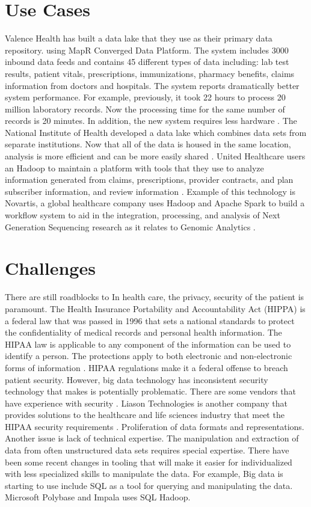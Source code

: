 \documentclass[sigconf]{acmart}
\begin{document}
 \section{Use Cases}
Valence Health has built a data lake that they use as their primary data repository. using MapR Converged Data Platform. The system includes 3000 inbound data feeds and contains 45 different types of data including:  lab test results, patient vitals, prescriptions, immunizations, pharmacy benefits, claims information from doctors and hospitals. The system reports dramatically better system performance. For example, previously, it took 22 hours to process 20 million laboratory records. Now the processing time for the same number of records is 20 minutes. In addition, the new system requires less hardware \cite{www-google-McDonald}. 
The National Institute of Health developed a data lake which combines data sets from separate institutions. Now that all of the data is housed in the same location, analysis is more efficient and can be more easily shared \cite{www-google-McDonald}.
United Healthcare users an Hadoop to maintain a platform with tools that they use to analyze information generated from claims, prescriptions, provider contracts, and plan subscriber information, and review information \cite{www-google-McDonald}.
Example of this technology is Novartis, a global healthcare company uses Hadoop and Apache Spark to build a workflow system to aid in the integration, processing, and analysis of Next Generation Sequencing research as it relates to Genomic Analytics \cite{www-google-McDonald}.


\section{Challenges}
There are still roadblocks to 
In health care, the privacy, security of the patient is paramount. The Health Insurance Portability and Accountability Act (HIPPA) is a federal law that was passed in 1996 that sets a national standards to protect the confidentiality of medical records and personal health information. The HIPAA law is applicable to any component of the information can be used to identify a person. The protections apply to both electronic and non-electronic forms of information \cite{HIPAA}. HIPAA regulations make it a federal offense to breach patient security.  However, big data technology has inconsistent security technology that makes is potentially problematic. There are some vendors that have experience with security \cite{HlthCat}. Liason Technologies is another company that provides solutions to the healthcare and life sciences industry that meet the HIPAA security requirements \cite{www-google-McDonald}.  
Proliferation of data formats and representations.
Another issue is lack of technical expertise. The manipulation and extraction of data from often unstructured data sets requires special expertise. There have been some recent changes in tooling that will make it easier for individualized with less specialized skills to manipulate the data. For example, Big data is starting to use include SQL as a tool for querying and manipulating the data. Microsoft Polybase and Impala uses SQL Hadoop. 
 
\end{document}
